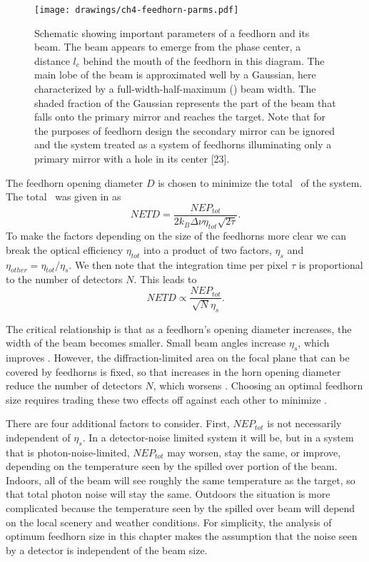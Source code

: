 \begin{figure}
\centering
\texttt{[image: drawings/ch4-feedhorn-parms.pdf]}
\caption[Schematic showing important parameters of a feedhorn and its beam]{
  Schematic showing important parameters of a feedhorn and its beam.
  The beam appears to emerge from the phase center, a distance $l_c$ behind the mouth of the feedhorn in this diagram.
  The main lobe of the beam is approximated well by a Gaussian, here characterized by a full-width-half-maximum (\FWHM) beam width.
  The shaded fraction of the Gaussian represents the part of the beam that falls onto the primary mirror and reaches the target.
  Note that for the purposes of feedhorn design the secondary mirror can be ignored and the system treated as a system of feedhorns illuminating only a primary mirror with a hole in its center [23].}
\label{fig:feedhorn-parms}
\end{figure}

The feedhorn opening diameter $D$ is chosen to minimize the total \NETD\ of the system.
The total \NETD\ was given in  as
\begin{equation}
    NETD = \frac{NEP_{tot}}{2 k_B \Delta \nu \eta_{tot} \sqrt{2 \tau}}.
\end{equation}
To make the factors depending on the size of the feedhorns more clear we can break the optical efficiency $\eta_{tot}$ into a product of two factors, $\eta_s$ and $\eta_{other} = \eta_{tot} / \eta_s$.
We then note that the integration time per pixel $\tau$ is proportional to the number of detectors $N$.
This leads to
\begin{equation}
    NETD \propto \frac{NEP_{tot}}{\sqrt{N}\eta_s}.
\end{equation}

The critical relationship is that as a feedhorn's opening diameter increases, the width of the beam becomes smaller.
Small beam angles increase $\eta_s$, which improves \NETD.
However, the diffraction-limited area on the focal plane that can be covered by feedhorns is fixed, so that increases in the horn opening diameter reduce the number of detectors $N$, which worsens \NETD.
Choosing an optimal feedhorn size requires trading these two effects off against each other to minimize \NETD.

There are four additional factors to consider.
First, $NEP_{tot}$ is not necessarily independent of $\eta_s$.
In a detector-noise limited system it will be, but in a system that is photon-noise-limited, $NEP_{tot}$ may worsen, stay the same, or improve, depending on the temperature seen by the spilled over portion of the beam.
Indoors, all of the beam will see roughly the same temperature as the target, so that total photon noise will stay the same.
Outdoors the situation is more complicated because the temperature seen by the spilled over beam will depend on the local scenery and weather conditions.
For simplicity, the analysis of optimum feedhorn size in this chapter makes the assumption that the noise seen by a detector is independent of the beam size.

